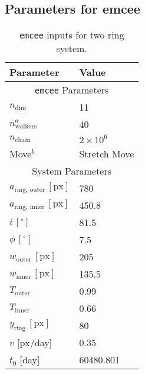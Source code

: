 \documentclass[letter]{aa} %
\begin{document}
\begin{appendix}
\FloatBarrier
\newpage
\section{Parameters for emcee}

\begin{table}[ht]
\centering
\begin{threeparttable}
    \caption{\texttt{emcee} inputs for two ring system.}
    \begin{tabular}{p{3cm} p{3cm}}
    \hline
    \textbf{Parameter} & {\textbf{Value}}\\
    \hline
    \hline
    \multicolumn{2}{c}{\texttt{emcee} Parameters}\\
    \hline
    $n_{\ensuremath{\mathrm{dim}}}$ & 11 \\
    $n_{\ensuremath{\mathrm{walkers}}}^a$ & 40  \\
    $n_{\ensuremath{\mathrm{chain}}}$ & $2\times10^6$ \\
    Move$^b$ & Stretch Move\\
    \hline
    \multicolumn{2}{c}{System Parameters}\\
    \hline
    $a_{\ensuremath{\mathrm{ring, \,outer}}} \, [\ensuremath{\mathrm{px}}]$ & 780 \\
    $a_{\ensuremath{\mathrm{ring, \,inner}}} \, [\ensuremath{\mathrm{px}}]$ & 450.8 \\
    $i \, [^\circ]$ & 81.5 \\
    $\phi \, [^\circ]$ &  7.5\\
    $w_{\ensuremath{\mathrm{outer}}} \, [\ensuremath{\mathrm{px}}]$ & 205 \\
    $w_{\ensuremath{\mathrm{inner}}} \, [\ensuremath{\mathrm{px}}]$ & 135.5 \\
    $T_{\ensuremath{\mathrm{outer}}}$ & 0.99 \\
    $T_{\ensuremath{\mathrm{inner}}}$ & 0.66 \\
    $y_{\ensuremath{\mathrm{ring}}} \, [\ensuremath{\mathrm{px}}]$ & 80 \\
    $v$ [\ensuremath{\mathrm{px}}/day] & 0.35 \\
    $t_0$ [day] & 60480.801 \\
    \hline
    \end{tabular}
    \label{tab:emcee_all_fit}
\end{threeparttable}
\end{table}
\newpage
\FloatBarrier


\end{appendix}
\end{document}
